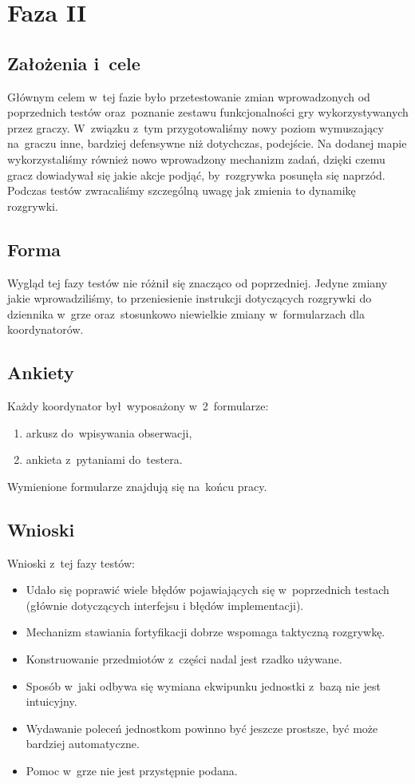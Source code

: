 \documentclass[licencjacka]{pracamgr}
\begin{document}
  \section{Faza II}

    \subsection{Założenia i~cele}
      Głównym celem w~tej fazie było przetestowanie zmian wprowadzonych od poprzednich testów oraz~poznanie zestawu funkcjonalności gry
      wykorzystywanych przez graczy. W~związku z~tym przygotowaliśmy nowy poziom wymuszający na~graczu inne, bardziej defensywne
      niż dotychczas, podejście. Na dodanej mapie wykorzystaliśmy również nowo wprowadzony mechanizm zadań, dzięki czemu gracz
      dowiadywał się jakie akcje podjąć, by~rozgrywka posunęła się naprzód. Podczas testów zwracaliśmy szczególną uwagę jak zmienia
      to dynamikę rozgrywki.

    \subsection{Forma}
      Wygląd tej fazy testów nie różnił się znacząco od poprzedniej. Jedyne zmiany jakie wprowadziliśmy,
      to przeniesienie instrukcji dotyczących rozgrywki do dziennika w~grze oraz~stosunkowo niewielkie zmiany
      w~formularzach dla koordynatorów.

    \subsection{Ankiety}
      Każdy koordynator był~wyposażony w~2~formularze:
      \begin{enumerate}
	\item arkusz do~wpisywania obserwacji,
	\item ankieta z~pytaniami do~testera.
      \end{enumerate}

      \noindent
      Wymienione formularze znajdują się na~końcu pracy.

    \subsection{Wnioski}
      Wnioski z~tej fazy testów:
      \begin{itemize}
	\item Udało się poprawić wiele błędów pojawiających się w~poprzednich testach (głównie dotyczących interfejsu i błędów implementacji).
	\item Mechanizm stawiania fortyfikacji dobrze wspomaga taktyczną rozgrywkę.
	\item Konstruowanie przedmiotów z~części nadal jest rzadko używane.
	\item Sposób w~jaki odbywa się wymiana ekwipunku jednostki z~bazą nie jest intuicyjny.
	\item Wydawanie poleceń jednostkom powinno być jeszcze prostsze, być może bardziej automatyczne.
	\item Pomoc w~grze nie jest przystępnie podana.
      \end{itemize}
\end{document}

